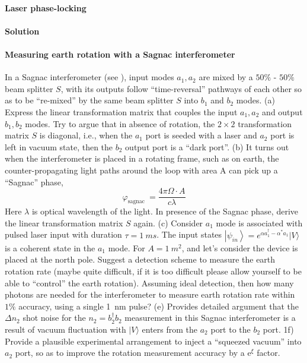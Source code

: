 \documentclass[hyperref, a4paper]{article}
\begin{document}
\paragraph{Laser phase-locking} 

\paragraph{Solution}

\paragraph{}

\paragraph{Measuring earth rotation with a Sagnac interferometer} In a Sagnac interferometer (see ), input modes ${a}_{1}, {a}_{2}$ are mixed by a $50 \%$ - $50 \%$ beam splitter $S$, with its outputs follow ``time-reversal'' pathways of each other so as to be ``re-mixed'' by the same beam splitter $S$ into ${b}_{1}$ and ${b}_{2}$ modes.
(a) Express the linear transformation matrix that couples the input $a_{1}, a_{2}$ and output ${b}_{1}, {b}_{2}$ modes. Try to argue that in absence of rotation, the $2 \times 2$ transformation matrix ${S}$ is diagonal, i.e., when the $a_1$ port is seeded with a laser and $a_2$ port is left in vacuum state, then the $b_2$ output port is a ``dark port''.
(b) It turns out when the interferometer is placed in a rotating frame, such as on earth, the counter-propagating light paths around the loop with area A can pick up a ``Sagnac'' phase,
\[
\varphi_{\text {sagnac }}=\frac{4 \pi \Omega \cdot A}{c \lambda}
\]
Here $\lambda$ is optical wavelength of the light. In presence of the Sagnac phase, derive the linear transformation matrix ${S}$ again.
(c) Consider $a_{1}$ mode is associated with pulsed laser input with duration $\tau=\SI{1}{ms}$.
The input states $\left|\psi_{{in}}\right\rangle={e}^{\alpha a_{1}^{\dagger}-\alpha^{*} a_{1}}|V\rangle$ is a coherent state in the $a_{1}$ mode. For ${A}=\SI{1}{m^2}$, and let's consider the device is placed at the north pole. Suggest a detection scheme to measure the earth rotation rate (maybe quite difficult, if it is too difficult please allow yourself to be able to ``control'' the earth rotation). Assuming ideal detection, then how many photons are needed for the interferometer to measure earth rotation rate within $1 \%$ accuracy, using a single \SI{1}{nm} pulse?
(e) Provides detailed argument that the $\Delta {n}_{2}$ shot noise for the ${n}_{2}=b_{2}^{\dagger} b_{2}$ measurement in this Sagnac interferometer is a result of vacuum fluctuation with $|V\rangle$ enters from the $a_{2}$ port to the $b_{2}$ port.
1f) Provide a plausible experimental arrangement to inject a ``squeezed vacuum'' into $a_{2}$ port, so as to improve the rotation measurement accuracy by a $\mathrm{e}^{\xi}$ factor.
\end{document}

